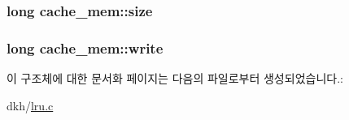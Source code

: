 \hypertarget{structcache__mem_a58c6a91c40d59398a3ed18daccc448fc}{
\subsubsection[{size}]{\setlength{\rightskip}{0pt plus 5cm}long cache\+\_\+mem\+::size}}\label{structcache__mem_a58c6a91c40d59398a3ed18daccc448fc}
\hypertarget{structcache__mem_adb5a0315176779908235c7ed3e41ec57}{
\subsubsection[{write}]{\setlength{\rightskip}{0pt plus 5cm}long cache\+\_\+mem\+::write}}\label{structcache__mem_adb5a0315176779908235c7ed3e41ec57}


이 구조체에 대한 문서화 페이지는 다음의 파일로부터 생성되었습니다.\+:\begin{DoxyCompactItemize}
\item 
dkh/\hyperlink{lru_8c}{lru.\+c}\end{DoxyCompactItemize}
